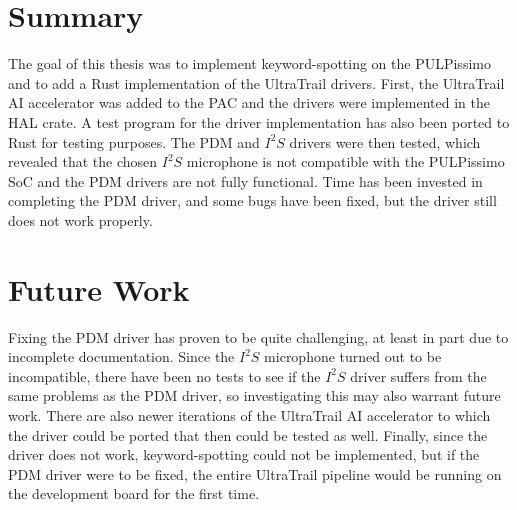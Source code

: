 
\section{Summary}

The goal of this thesis was to implement keyword-spotting on the PULPissimo and to add a Rust implementation of the UltraTrail drivers.
First, the UltraTrail AI accelerator was added to the PAC and the drivers were implemented in the HAL crate.
A test program for the driver implementation has also been ported to Rust for testing purposes.
The PDM and $I^2S$ drivers were then tested, which revealed that the chosen $I^2S$
microphone is not compatible with the PULPissimo SoC and the PDM drivers are not fully functional.
Time has been invested in completing the PDM driver, and some bugs have been fixed, but the driver still does not work properly.

\section{Future Work}

Fixing the PDM driver has proven to be quite challenging, at least in part due to incomplete documentation.
Since the $I^2S$ microphone turned out to be incompatible, there have been no tests to see if the $I^2S$
driver suffers from the same problems as the PDM driver, so investigating this may also warrant future work.
There are also newer iterations of the UltraTrail AI accelerator to which the driver could be ported
that then could be tested as well.
Finally, since the driver does not work, keyword-spotting could not be implemented,
but if the PDM driver were to be fixed, the entire UltraTrail pipeline would be running on the development board for the first time.
